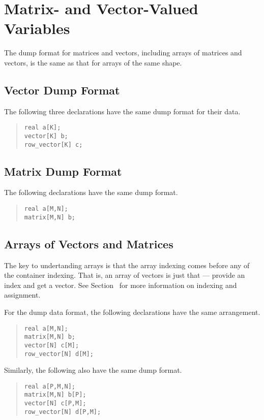 \section{Matrix- and Vector-Valued Variables}

The dump format for matrices and vectors, including arrays of matrices
and vectors, is the same as that for arrays of the same shape.

\subsection{Vector Dump Format}

The following three declarations have the same dump format for their
data.
%
\begin{quote}
\begin{Verbatim}
real a[K];
vector[K] b;
row_vector[K] c;
\end{Verbatim}
\end{quote}

\subsection{Matrix Dump Format}

The following declarations have the same dump format.
%
\begin{quote}
\begin{Verbatim}
real a[M,N];
matrix[M,N] b;
\end{Verbatim}
\end{quote}

\subsection{Arrays of Vectors and Matrices}

The key to undertanding arrays is that the array indexing comes before
any of the container indexing.  That is, an array of vectors is just
that --- provide an index and get a vector.  See
Section~ for more information on
indexing and assignment.

For the dump data format, the following declarations have the same
arrangement.
%
\begin{quote}
\begin{Verbatim}
real a[M,N];
matrix[M,N] b;
vector[N] c[M];
row_vector[N] d[M];
\end{Verbatim}
\end{quote}
%
Similarly, the following also have the same dump format.
%
\begin{quote}
\begin{Verbatim}
real a[P,M,N];
matrix[M,N] b[P];
vector[N] c[P,M];
row_vector[N] d[P,M];
\end{Verbatim}
\end{quote}

